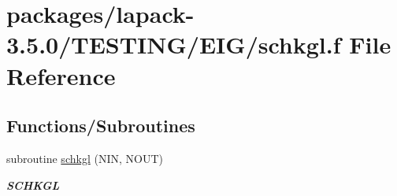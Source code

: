 \hypertarget{schkgl_8f}{}\section{packages/lapack-\/3.5.0/\+T\+E\+S\+T\+I\+N\+G/\+E\+I\+G/schkgl.f File Reference}
\label{schkgl_8f}
\subsection*{Functions/\+Subroutines}
\begin{DoxyCompactItemize}
\item 
subroutine \hyperlink{group__single__eig_gae4e43fee22351ea965e03ba9228aff5a}{schkgl} (N\+I\+N, N\+O\+U\+T)
\begin{DoxyCompactList}\small\item\em {\bfseries S\+C\+H\+K\+G\+L} \end{DoxyCompactList}\end{DoxyCompactItemize}
